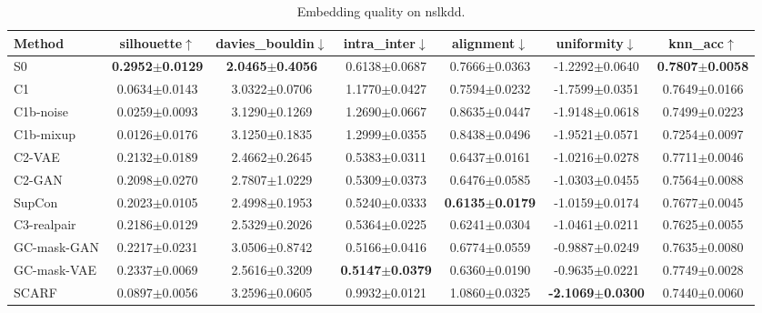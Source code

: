 \begin{table}[t]
\centering
\caption{Embedding quality on nslkdd.}
\label{tab:emb_nslkdd}
\small
\begin{tabular}{lcccccc}
\toprule
Method & silhouette$\uparrow$ & davies\_bouldin$\downarrow$ & intra\_inter$\downarrow$ & alignment$\downarrow$ & uniformity$\downarrow$ & knn\_acc$\uparrow$ \\
\midrule
S0 & \textbf{0.2952$\pm$0.0129} & \textbf{2.0465$\pm$0.4056} & 0.6138$\pm$0.0687 & 0.7666$\pm$0.0363 & -1.2292$\pm$0.0640 & \textbf{0.7807$\pm$0.0058} \\
C1 & 0.0634$\pm$0.0143 & 3.0322$\pm$0.0706 & 1.1770$\pm$0.0427 & 0.7594$\pm$0.0232 & -1.7599$\pm$0.0351 & 0.7649$\pm$0.0166 \\
C1b-noise & 0.0259$\pm$0.0093 & 3.1290$\pm$0.1269 & 1.2690$\pm$0.0667 & 0.8635$\pm$0.0447 & -1.9148$\pm$0.0618 & 0.7499$\pm$0.0223 \\
C1b-mixup & 0.0126$\pm$0.0176 & 3.1250$\pm$0.1835 & 1.2999$\pm$0.0355 & 0.8438$\pm$0.0496 & -1.9521$\pm$0.0571 & 0.7254$\pm$0.0097 \\
C2-VAE & 0.2132$\pm$0.0189 & 2.4662$\pm$0.2645 & 0.5383$\pm$0.0311 & 0.6437$\pm$0.0161 & -1.0216$\pm$0.0278 & 0.7711$\pm$0.0046 \\
C2-GAN & 0.2098$\pm$0.0270 & 2.7807$\pm$1.0229 & 0.5309$\pm$0.0373 & 0.6476$\pm$0.0585 & -1.0303$\pm$0.0455 & 0.7564$\pm$0.0088 \\
SupCon & 0.2023$\pm$0.0105 & 2.4998$\pm$0.1953 & 0.5240$\pm$0.0333 & \textbf{0.6135$\pm$0.0179} & -1.0159$\pm$0.0174 & 0.7677$\pm$0.0045 \\
C3-realpair & 0.2186$\pm$0.0129 & 2.5329$\pm$0.2026 & 0.5364$\pm$0.0225 & 0.6241$\pm$0.0304 & -1.0461$\pm$0.0211 & 0.7625$\pm$0.0055 \\
GC-mask-GAN & 0.2217$\pm$0.0231 & 3.0506$\pm$0.8742 & 0.5166$\pm$0.0416 & 0.6774$\pm$0.0559 & -0.9887$\pm$0.0249 & 0.7635$\pm$0.0080 \\
GC-mask-VAE & 0.2337$\pm$0.0069 & 2.5616$\pm$0.3209 & \textbf{0.5147$\pm$0.0379} & 0.6360$\pm$0.0190 & -0.9635$\pm$0.0221 & 0.7749$\pm$0.0028 \\
SCARF & 0.0897$\pm$0.0056 & 3.2596$\pm$0.0605 & 0.9932$\pm$0.0121 & 1.0860$\pm$0.0325 & \textbf{-2.1069$\pm$0.0300} & 0.7440$\pm$0.0060 \\
\bottomrule
\end{tabular}
\end{table}